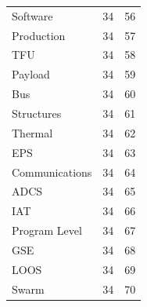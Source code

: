 \begin{table}[htbp]
\begin{tabular}{p{10cm} | c | c }
  \hspace{1.0cm}Software &         34 &         56 \\

\hspace{1.0cm}Production &         34 &         57 \\

       \hspace{2.0cm}TFU &         34 &         58 \\

   \hspace{2.5cm}Payload &         34 &         59 \\

       \hspace{2.5cm}Bus &         34 &         60 \\

 \hspace{3.0cm}Structures &         34 &         61 \\

   \hspace{3.0cm}Thermal &         34 &         62 \\

       \hspace{3.0cm}EPS &         34 &         63 \\

\hspace{3.0cm}Communications &         34 &         64 \\

      \hspace{3.0cm}ADCS &         34 &         65 \\

       \hspace{2.5cm}IAT &         34 &         66 \\

\hspace{2.5cm}Program Level &         34 &         67 \\

       \hspace{2.5cm}GSE &         34 &         68 \\

      \hspace{2.5cm}LOOS &         34 &         69 \\

     \hspace{2.0cm}Swarm &         34 &         70 \\ \hline


\end{tabular}
\end{table}
